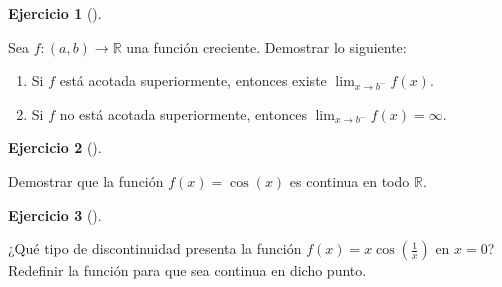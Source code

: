 \documentclass[
  a4paper,
]{scrreport}
\providecommand{\tightlist}{%
  \setlength{\itemsep}{0pt}\setlength{\parskip}{0pt}}\usepackage{longtable,booktabs,array}
\theoremstyle{definition}
\newtheorem{exercise}{Ejercicio}[chapter]
\theoremstyle{remark}
\begin{document}
\leavevmode{}%
\begin{exercise}[]\label{exr-limites-funciones-acotadas}

Sea \(f:(a,b)\to \mathbb{R}\) una función creciente. Demostrar lo
siguiente:

\begin{enumerate}
\def\labelenumi{\alph{enumi}.}
\tightlist
\item
  Si \(f\) está acotada superiormente, entonces existe
  \(\lim_{x\to b^-}f(x)\).
\item
  Si \(f\) no está acotada superiormente, entonces
  \(\lim_{x\to b^-}f(x)=\infty\).
\end{enumerate}

\end{exercise}

\leavevmode{}%
\begin{exercise}[]\label{exr-continuidad-coseno}

Demostrar que la función \(f(x)=\cos(x)\) es continua en todo
\(\mathbb{R}\).

\end{exercise}

\leavevmode{}%
\begin{exercise}[]\label{exr-discontinuidad-evitable}

¿Qué tipo de discontinuidad presenta la función
\(f(x)=x\cos\left(\frac{1}{x}\right)\) en \(x=0\)? Redefinir la función
para que sea continua en dicho punto.

\end{exercise}
\end{document}
